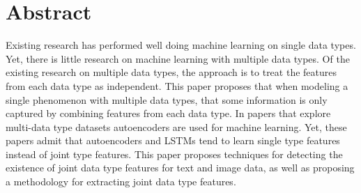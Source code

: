 \section{Abstract}

Existing research has performed well doing machine learning on single data types.
Yet, there is little research on machine learning with multiple data types. Of the
existing research on multiple data types, the approach is to treat the features from
each data type as independent. This paper proposes that when modeling a single
phenomenon with multiple data types, that some information is only captured by
combining features from each data type.  In papers that explore multi-data type datasets autoencoders are used for machine learning.  Yet, these papers admit that autoencoders and LSTMs tend to learn single type features instead of joint type features.  This paper proposes techniques for detecting the existence of joint data type features for text and image data, as well as proposing a methodology for extracting joint data type features.  





